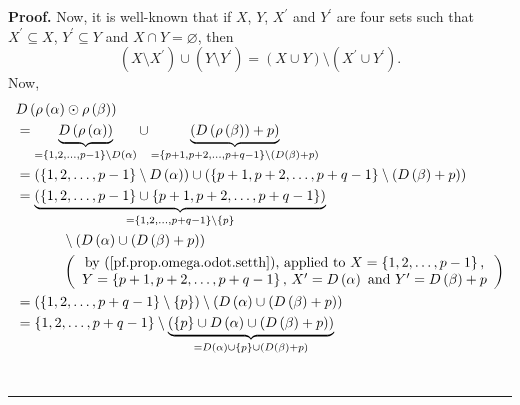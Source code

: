 \documentclass
[numbers=enddot,12pt,final,onecolumn,notitlepage,abstracton]{scrartcl}%
\theoremstyle{definition}
\newenvironment{proof}[1][Proof]{\noindent\textbf{#1.} }{\ \rule{0.5em}{0.5em}}
\newenvironment{verlong}{}{}
\begin{document}
\begin{verlong}
\begin{proof}
Now, it is well-known that if $X$, $Y$, $X^{\prime}$ and $Y^{\prime}$ are four
sets such that $X^{\prime}\subseteq X$, $Y^{\prime}\subseteq Y$ and $X\cap
Y=\varnothing$, then
\begin{equation}
\left(  X\setminus X^{\prime}\right)  \cup\left(  Y\setminus Y^{\prime
}\right)  =\left(  X\cup Y\right)  \setminus\left(  X^{\prime}\cup Y^{\prime
}\right)  . \label{pf.prop.omega.odot.setth}%
\end{equation}
Now,%
\begin{align*}
&  D\left(  \rho\left(  \alpha\right)  \odot\rho\left(  \beta\right)  \right)
\\
&  =\underbrace{D\left(  \rho\left(  \alpha\right)  \right)  }_{=\left\{
1,2,\ldots,p-1\right\}  \setminus D\left(  \alpha\right)  }\cup
\underbrace{\left(  D\left(  \rho\left(  \beta\right)  \right)  +p\right)
}_{=\left\{  p+1,p+2,\ldots,p+q-1\right\}  \setminus\left(  D\left(
\beta\right)  +p\right)  }\\
&  =\left(  \left\{  1,2,\ldots,p-1\right\}  \setminus D\left(  \alpha\right)
\right)  \cup\left(  \left\{  p+1,p+2,\ldots,p+q-1\right\}  \setminus\left(
D\left(  \beta\right)  +p\right)  \right) \\
&  =\underbrace{\left(  \left\{  1,2,\ldots,p-1\right\}  \cup\left\{
p+1,p+2,\ldots,p+q-1\right\}  \right)  }_{=\left\{  1,2,\ldots,p+q-1\right\}
\setminus\left\{  p\right\}  }\\
&  \ \ \ \ \ \ \ \ \ \ \setminus\left(  D\left(  \alpha\right)  \cup\left(
D\left(  \beta\right)  +p\right)  \right) \\
&  \ \ \ \ \ \ \ \ \ \ \left(
\begin{array}
[c]{c}%
\text{by (\ref{pf.prop.omega.odot.setth}), applied to }X=\left\{
1,2,\ldots,p-1\right\}  \text{,}\\
Y=\left\{  p+1,p+2,\ldots,p+q-1\right\}  \text{, }X^{\prime}=D\left(
\alpha\right)  \text{ and }Y^{\prime}=D\left(  \beta\right)  +p
\end{array}
\right) \\
&  =\left(  \left\{  1,2,\ldots,p+q-1\right\}  \setminus\left\{  p\right\}
\right)  \setminus\left(  D\left(  \alpha\right)  \cup\left(  D\left(
\beta\right)  +p\right)  \right) \\
&  =\left\{  1,2,\ldots,p+q-1\right\}  \setminus\underbrace{\left(  \left\{
p\right\}  \cup D\left(  \alpha\right)  \cup\left(  D\left(  \beta\right)
+p\right)  \right)  }_{=D\left(  \alpha\right)  \cup\left\{  p\right\}
\cup\left(  D\left(  \beta\right)  +p\right)  }\\

\end{align*}
\end{proof}
\end{verlong}
\end{document}
